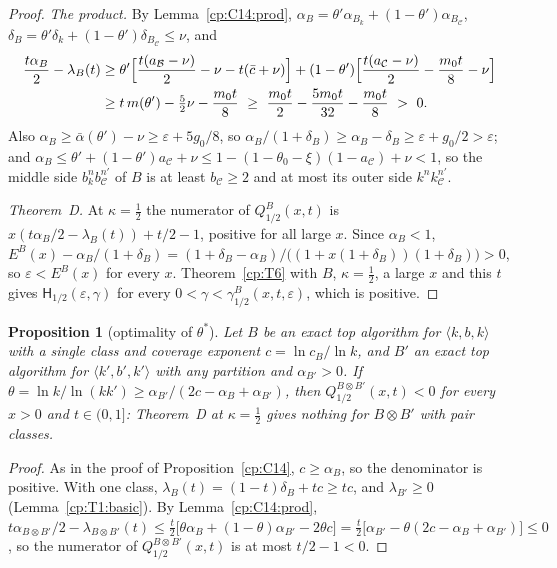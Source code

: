 \documentclass[11pt]{article}
\newtheorem{proposition}[theorem]{Proposition}
\theoremstyle{definition}
\theoremstyle{remark}
\providecommand{\eps}{\varepsilon}
\newcommand{\mat}[3]{\langle #1,#2,#3\rangle} %
\newcommand{\Hypk}[1]{\mathsf{H}_{#1}}        %
\newcommand{\cB}{c_B}                         %
\newcommand{\lamB}{\lambda_B}                 %
\newcommand{\delB}{\delta_B}                  %
\newcommand{\alB}{\alpha_B}                   %
\newcommand{\ThmD}{Theorem~D}                               %
\newcommand{\Qgain}[2]{Q^{#1}_{#2}}           %
\newcommand{\Erange}[1]{E^{#1}}               %
\newcommand{\gbound}[2]{\gamma^{#1}_{#2}}     %
\begin{document}
\begin{proof}
\emph{The product.} By Lemma~\ref{cp:C14:prod}, $\alB=\theta'\alpha_{B_k}+(1-\theta')\alpha_{B_{\mathcal C}}$, $\delB=\theta'\delta_k+(1-\theta')\delta_{B_{\mathcal C}}\le\nu$, and
\begin{align*}
\frac{t\alB}2-\lamB(t)&\ge\theta'\Bigl[\frac{t(a_{\mathcal B}-\nu)}2-\nu-t(\bar c+\nu)\Bigr]+(1-\theta')\Bigl[\frac{t(a_{\mathcal C}-\nu)}2-\frac{m_0t}8-\nu\Bigr]\\
&\ge t\,m(\theta')-\tfrac52\nu-\frac{m_0t}8\ \ge\ \frac{m_0t}2-\frac{5m_0t}{32}-\frac{m_0t}8\ >\ 0.
\end{align*}
Also $\alB\ge\bar\alpha(\theta')-\nu\ge\eps+5g_0/8$, so $\alB/(1+\delB)\ge\alB-\delB\ge\eps+g_0/2>\eps$; and $\alB\le\theta'+(1-\theta')a_{\mathcal C}+\nu\le1-(1-\theta_0-\xi)(1-a_{\mathcal C})+\nu<1$, so the middle side $b_k^nb_{\mathcal C}^{n'}$ of $B$ is at least $b_{\mathcal C}\ge2$ and at most its outer side $k^nk_{\mathcal C}^{n'}$.

\emph{\ThmD.} At $\kappa=\frac12$ the numerator of $\Qgain B{1/2}(x,t)$ is $x(t\alB/2-\lamB(t))+t/2-1$, positive for all large $x$. Since $\alB<1$, $\Erange B(x)-\alB/(1+\delB)=(1+\delB-\alB)/\bigl((1+x(1+\delB))(1+\delB)\bigr)>0$, so $\eps<\Erange B(x)$ for every $x$. Theorem~\ref{cp:T6} with $B$, $\kappa=\frac12$, a large $x$ and this $t$ gives $\Hypk{1/2}(\eps,\gamma)$ for every $0<\gamma<\gbound B{1/2}(x,t,\eps)$, which is positive.
\end{proof}

\begin{proposition}[optimality of $\theta^*$]\label{cp:C15}
Let $B$ be an exact top algorithm for $\mat kbk$ with a single class and coverage exponent $c=\ln\cB/\ln k$, and $B'$ an exact top algorithm for $\mat{k'}{b'}{k'}$ with any partition and $\alpha_{B'}>0$. If $\theta=\ln k/\ln(kk')\ge\alpha_{B'}/(2c-\alB+\alpha_{B'})$, then $\Qgain{B\otimes B'}{1/2}(x,t)<0$ for every $x>0$ and $t\in(0,1]$: \ThmD{} at $\kappa=\frac12$ gives nothing for $B\otimes B'$ with pair classes.
\end{proposition}

\begin{proof}
As in the proof of Proposition~\ref{cp:C14}, $c\ge\alB$, so the denominator is positive. With one class, $\lamB(t)=(1-t)\delB+tc\ge tc$, and $\lambda_{B'}\ge0$ (Lemma~\ref{cp:T1:basic}). By Lemma~\ref{cp:C14:prod}, $t\alpha_{B\otimes B'}/2-\lambda_{B\otimes B'}(t)\le\frac t2\bigl[\theta\alB+(1-\theta)\alpha_{B'}-2\theta c\bigr]=\frac t2\bigl[\alpha_{B'}-\theta(2c-\alB+\alpha_{B'})\bigr]\le0$, so the numerator of $\Qgain{B\otimes B'}{1/2}(x,t)$ is at most $t/2-1<0$.
\end{proof}
\end{document}
